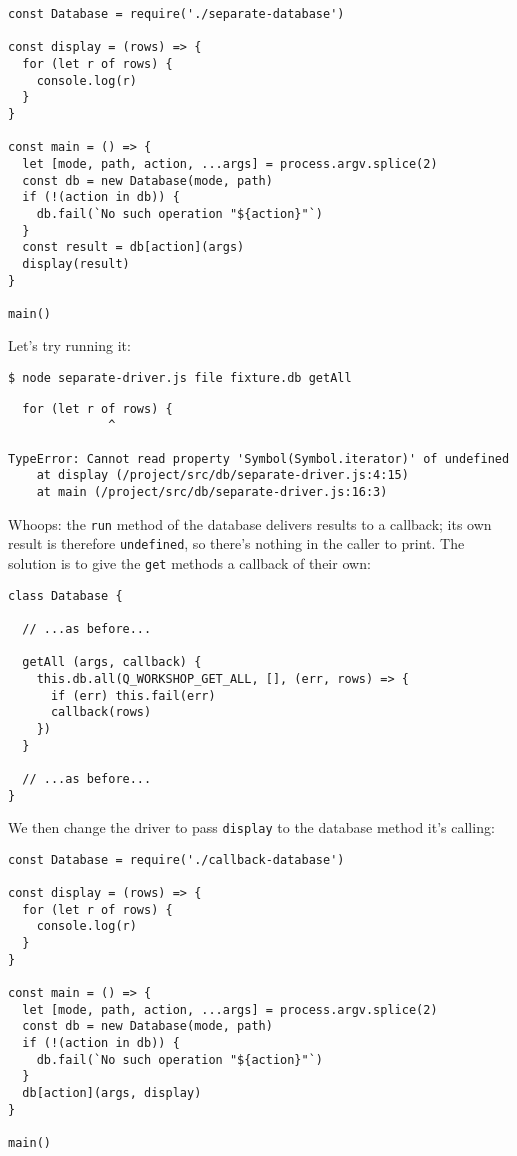 \begin{verbatim}
const Database = require('./separate-database')

const display = (rows) => {
  for (let r of rows) {
    console.log(r)
  }
}

const main = () => {
  let [mode, path, action, ...args] = process.argv.splice(2)
  const db = new Database(mode, path)
  if (!(action in db)) {
    db.fail(`No such operation "${action}"`)
  }
  const result = db[action](args)
  display(result)
}

main()
\end{verbatim}

Let's try running it:

\begin{verbatim}
$ node separate-driver.js file fixture.db getAll
\end{verbatim}

\begin{verbatim}
  for (let r of rows) {
              ^

TypeError: Cannot read property 'Symbol(Symbol.iterator)' of undefined
    at display (/project/src/db/separate-driver.js:4:15)
    at main (/project/src/db/separate-driver.js:16:3)
\end{verbatim}

Whoops: the \texttt{run} method of the database delivers results to a callback;
its own result is therefore \texttt{undefined},
so there's nothing in the caller to print.
The solution is to give the \texttt{get} methods a callback of their own:

\begin{verbatim}
class Database {

  // ...as before...

  getAll (args, callback) {
    this.db.all(Q_WORKSHOP_GET_ALL, [], (err, rows) => {
      if (err) this.fail(err)
      callback(rows)
    })
  }

  // ...as before...
}
\end{verbatim}

\noindent
We then change the driver to pass \texttt{display} to the database method it's calling:

\begin{verbatim}
const Database = require('./callback-database')

const display = (rows) => {
  for (let r of rows) {
    console.log(r)
  }
}

const main = () => {
  let [mode, path, action, ...args] = process.argv.splice(2)
  const db = new Database(mode, path)
  if (!(action in db)) {
    db.fail(`No such operation "${action}"`)
  }
  db[action](args, display)
}

main()
\end{verbatim}

